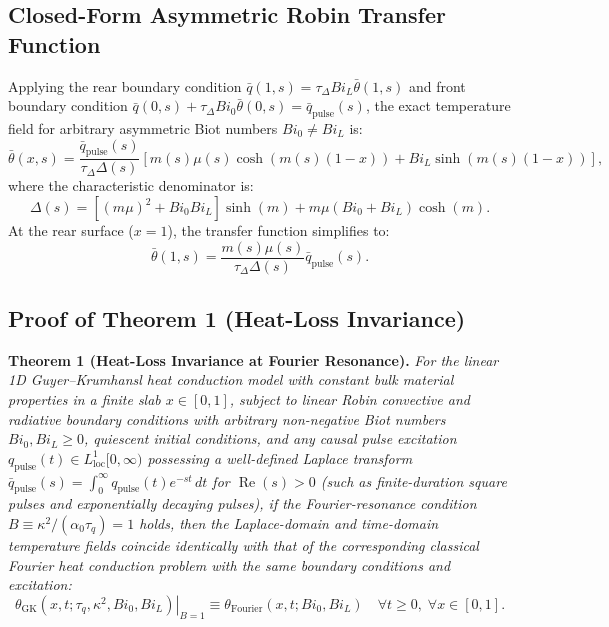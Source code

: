 \documentclass[preprint,12pt]{elsarticle}
\begin{document}
\subsection{Closed-Form Asymmetric Robin Transfer Function}

Applying the rear boundary condition $\bar{q}(1, s) = \tau_\Delta Bi_L \bar{\theta}(1, s)$ and front boundary condition $\bar{q}(0, s) + \tau_\Delta Bi_0 \bar{\theta}(0, s) = \bar{q}_{\mathrm{pulse}}(s)$, the exact temperature field for arbitrary asymmetric Biot numbers $Bi_0 \ne Bi_L$ is:
\begin{equation}
\bar{\theta}(x, s) = \frac{\bar{q}_{\mathrm{pulse}}(s)}{\tau_\Delta \Delta(s)} [m(s)\mu(s) \cosh(m(s)(1 - x)) + Bi_L \sinh(m(s)(1 - x))],
\label{eq:transfer_field}
\end{equation}
where the characteristic denominator is:
\begin{equation}
\Delta(s) = [(m\mu)^2 + Bi_0 Bi_L]\sinh(m) + m\mu (Bi_0 + Bi_L)\cosh(m).
\label{eq:delta_s}
\end{equation}
At the rear surface ($x = 1$), the transfer function simplifies to:
\begin{equation}
\bar{\theta}(1, s) = \frac{m(s)\mu(s)}{\tau_\Delta \Delta(s)} \bar{q}_{\mathrm{pulse}}(s).
\label{eq:transfer_rear}
\end{equation}

\subsection{Proof of Theorem 1 (Heat-Loss Invariance)}

\textbf{Theorem 1 (Heat-Loss Invariance at Fourier Resonance).} \textit{For the linear 1D Guyer--Krumhansl heat conduction model with constant bulk material properties in a finite slab $x \in [0, 1]$, subject to linear Robin convective and radiative boundary conditions with arbitrary non-negative Biot numbers $Bi_0, Bi_L \ge 0$, quiescent initial conditions, and any causal pulse excitation $q_{\mathrm{pulse}}(t) \in L^1_{\mathrm{loc}}[0,\infty)$ possessing a well-defined Laplace transform $\bar{q}_{\mathrm{pulse}}(s) = \int_0^\infty q_{\mathrm{pulse}}(t) e^{-st} \, dt$ for $\operatorname{Re}(s) > 0$ (such as finite-duration square pulses and exponentially decaying pulses), if the Fourier-resonance condition $B \equiv \kappa^2 / (\alpha_0 \tau_q) = 1$ holds, then the Laplace-domain and time-domain temperature fields coincide identically with that of the corresponding classical Fourier heat conduction problem with the same boundary conditions and excitation:}
\begin{equation}
\left. \theta_{\mathrm{GK}}(x, t; \tau_q, \kappa^2, Bi_0, Bi_L) \right|_{B=1} \equiv \theta_{\mathrm{Fourier}}(x, t; Bi_0, Bi_L) \quad \forall t \ge 0, \; \forall x \in [0, 1].
\label{eq:theorem_statement}
\end{equation}
\end{document}
